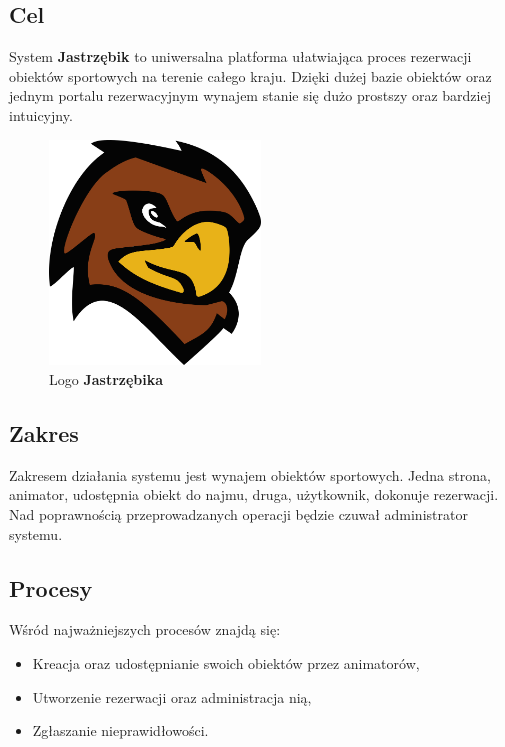 \documentclass[a4paper,11pt]{article}
\begin{document}
    \subsection{Cel} 

    System \textbf{Jastrzębik} to uniwersalna platforma ułatwiająca proces rezerwacji obiektów sportowych na terenie całego kraju. Dzięki dużej bazie obiektów oraz jednym portalu rezerwacyjnym wynajem stanie się dużo prostszy oraz bardziej intuicyjny.

    \begin{figure}[ht] 
    	\begin{center}
    		\includegraphics[width=0.5\textwidth]{Obrazki/Logo.png}
            \caption{Logo \textbf{Jastrzębika}}
    	\end{center}
    \end{figure}

    \subsection{Zakres}
    
    Zakresem działania systemu jest wynajem obiektów sportowych. Jedna strona, animator, udostępnia obiekt do najmu, druga, użytkownik, dokonuje rezerwacji. Nad poprawnością przeprowadzanych operacji będzie czuwał administrator systemu.

    \subsection{Procesy}
    Wśród najważniejszych procesów znajdą się:
    
    \begin{itemize}
        \item Kreacja oraz udostępnianie swoich obiektów przez animatorów,
        \item Utworzenie rezerwacji oraz administracja nią,
        \item Zgłaszanie nieprawidłowości.
    \end{itemize}
\end{document}

